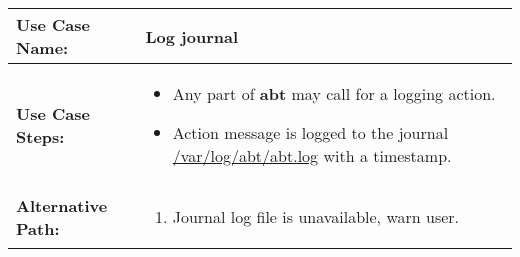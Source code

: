 \medskip

\begin{tabularx}{\linewidth}{|l|X|}
\hline
\textbf{Use Case Name:} & \textbf{Log journal} \\
\hline
\textbf{Use Case Steps:} & 
\begin{minipage}{\linewidth} 
  \vspace{0.05em}
  \begin{itemize}
    \item Any part of \textbf{abt} may call for a logging action.
    \item Action message is logged to the journal \url{/var/log/abt/abt.log} with a timestamp.
  \end{itemize}
  \vspace{0.05em}
\end{minipage}
\\
\hline 
\textbf{Alternative Path:} &
\begin{minipage}{\linewidth}
  \vspace{0.05em} 
  \begin{enumerate}
    \item Journal log file is unavailable, warn user.
  \end{enumerate}
  \vspace{0.05em} 
\end{minipage}
\\
\hline
\end{tabularx}